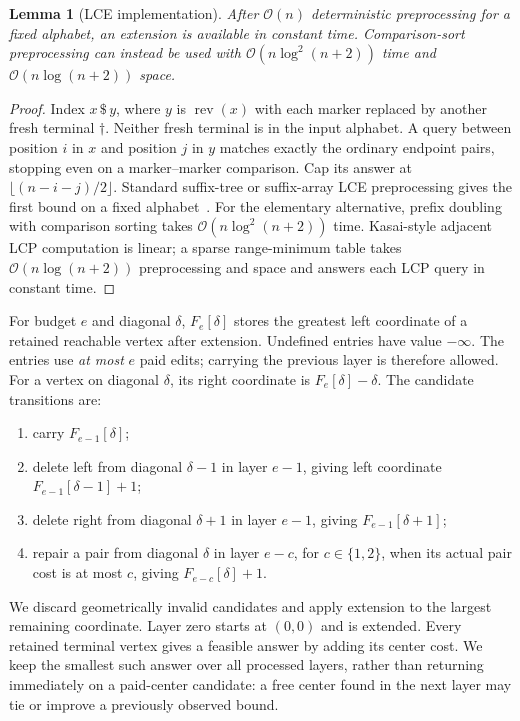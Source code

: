 \documentclass[sigconf,screen]{acmart}
\newcommand{\rev}{\operatorname{rev}}
\newcommand{\Oh}{\mathcal O}
\newtheorem{lemma}[theorem]{Lemma}
\theoremstyle{definition}
\begin{document}
\begin{lemma}[LCE implementation]\label{lem:lce}
After $\Oh(n)$ deterministic preprocessing for a fixed alphabet, an extension is available in constant time. Comparison-sort preprocessing can instead be used with $\Oh(n\log^2(n+2))$ time and $\Oh(n\log(n+2))$ space.
\end{lemma}
\begin{proof}
Index $x\,\$\,y$, where $y$ is $\rev(x)$ with each marker replaced by another fresh terminal $\dagger$. Neither fresh terminal is in the input alphabet. A query between position $i$ in $x$ and position $j$ in $y$ matches exactly the ordinary endpoint pairs, stopping even on a marker--marker comparison. Cap its answer at $\lfloor(n-i-j)/2\rfloor$. Standard suffix-tree or suffix-array LCE preprocessing gives the first bound on a fixed alphabet~\cite{gusfield1997}. For the elementary alternative, prefix doubling with comparison sorting takes $\Oh(n\log^2(n+2))$ time. Kasai-style adjacent LCP computation is linear; a sparse range-minimum table takes $\Oh(n\log(n+2))$ preprocessing and space and answers each LCP query in constant time.
\end{proof}

For budget $e$ and diagonal $\delta$, $F_e[\delta]$ stores the greatest left coordinate of a retained reachable vertex after extension. Undefined entries have value $-\infty$. The entries use \emph{at most} $e$ paid edits; carrying the previous layer is therefore allowed. For a vertex on diagonal $\delta$, its right coordinate is $F_e[\delta]-\delta$. The candidate transitions are:
\begin{enumerate}
\item carry $F_{e-1}[\delta]$;
\item delete left from diagonal $\delta-1$ in layer $e-1$, giving left coordinate $F_{e-1}[\delta-1]+1$;
\item delete right from diagonal $\delta+1$ in layer $e-1$, giving $F_{e-1}[\delta+1]$;
\item repair a pair from diagonal $\delta$ in layer $e-c$, for $c\in\{1,2\}$, when its actual pair cost is at most $c$, giving $F_{e-c}[\delta]+1$.
\end{enumerate}
We discard geometrically invalid candidates and apply extension to the largest remaining coordinate. Layer zero starts at $(0,0)$ and is extended. Every retained terminal vertex gives a feasible answer by adding its center cost. We keep the smallest such answer over all processed layers, rather than returning immediately on a paid-center candidate: a free center found in the next layer may tie or improve a previously observed bound.
\end{document}
